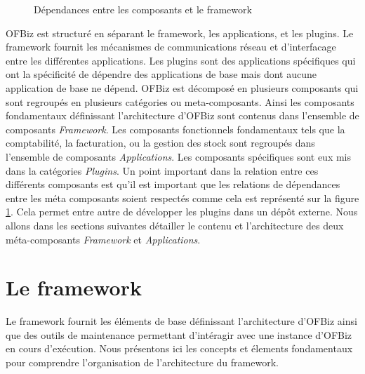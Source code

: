 \documentclass[a4paper, 11pt]{report}
\begin{document}
\begin{figure}
  \caption{Dépendances entre les composants et le framework}
  \label{fig:compdep}
\end{figure}

OFBiz est structuré en séparant le framework, les applications, et les
plugins. Le framework fournit les mécanismes de communications réseau
et d'interfacage entre les différentes applications. Les plugins sont
des applications spécifiques qui ont la spécificité de dépendre des
applications de base mais dont aucune application de base ne dépend.
OFBiz est décomposé en plusieurs composants qui sont regroupés en
plusieurs catégories ou meta-composants. Ainsi les composants
fondamentaux définissant l'architecture d'OFBiz sont contenus dans
l'ensemble de composants \emph{Framework}. Les composants fonctionnels
fondamentaux tels que la comptabilité, la facturation, ou la gestion
des stock sont regroupés dans l'ensemble de composants
\emph{Applications}. Les composants spécifiques sont eux mis dans la
catégories \emph{Plugins}. Un point important dans la relation entre
ces différents composants est qu'il est important que les relations de
dépendances entre les méta composants soient respectés comme cela est
représenté sur la figure \ref{fig:compdep}. Cela permet entre autre de
développer les plugins dans un dépôt externe. Nous allons dans les
sections suivantes détailler le contenu et l'architecture des deux
méta-composants \emph{Framework} et \emph{Applications}.

\section{Le framework}

Le framework fournit les éléments de base définissant l'architecture
d'OFBiz ainsi que des outils de maintenance permettant d'intéragir
avec une instance d'OFBiz en cours d'exécution. Nous présentons ici
les concepts et élements fondamentaux pour comprendre l'organisation
de l'architecture du framework.
\end{document}
